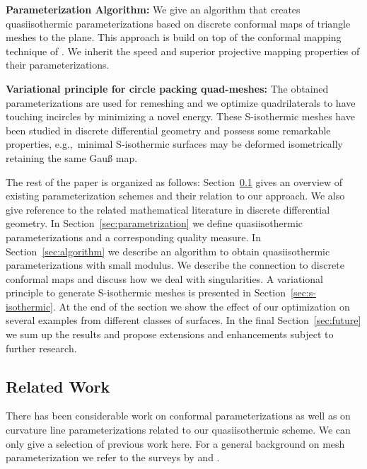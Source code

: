 \noindent\textbf{Parameterization Algorithm:}
We give an algorithm that creates quasiisothermic parameterizations based on discrete
conformal maps of triangle meshes to the plane. This approach is build on top 
of the conformal mapping technique of \cite{Springborn2008}. We
inherit the speed and superior projective mapping properties of their 
parameterizations.

\noindent\textbf{Variational principle for circle packing quad-meshes:}
The obtained parameterizations are used for remeshing and we optimize 
quadrilaterals to have touching incircles by minimizing a novel energy. These
S-isothermic meshes have been studied in discrete differential geometry and
possess some remarkable properties, e.g.,\ minimal S-isothermic surfaces may be
deformed isometrically retaining the same Gau{\ss} map.

The rest of the paper is organized as follows: Section~\ref{sec:previouswork}
gives an overview of existing parameterization schemes and their relation to
our approach. We also give reference to the related mathematical literature in
discrete differential geometry. In Section~\ref{sec:parametrization} we define
quasiisothermic parameterizations and a corresponding quality measure. 
In Section~\ref{sec:algorithm} we describe an algorithm to
obtain quasiisothermic parameterizations with small modulus. We describe the 
connection to discrete conformal maps and discuss how we deal with singularities. %
A variational principle to generate S-isothermic meshes is presented in
Section~\ref{sec:s-isothermic}. At the end of the section we show the effect of
our optimization on several examples from different classes of surfaces. In the
final Section~\ref{sec:future} we sum up the results and propose extensions and
enhancements subject to further research.


\subsection{Related Work}
\label{sec:previouswork}

There has been considerable work on conformal parameterizations as well as on
curvature line parameterizations related to our quasiisothermic scheme. We can 
only give a selection of previous work here.
For a general background on mesh parameterization we refer to the surveys by
\cite{Floater2005} and \cite{ShefferPR2006}.

